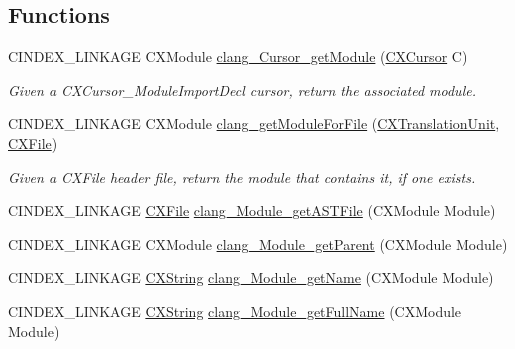 \subsection*{Functions}
\begin{DoxyCompactItemize}
\item 
\mbox{\label{group__CINDEX__MODULE_gab69ab0bc94760b2c93d63efa8cb6a6dd}} 
C\+I\+N\+D\+E\+X\+\_\+\+L\+I\+N\+K\+A\+GE C\+X\+Module \hyperlink{group__CINDEX__MODULE_gab69ab0bc94760b2c93d63efa8cb6a6dd}{clang\+\_\+\+Cursor\+\_\+get\+Module} (\hyperlink{structCXCursor}{C\+X\+Cursor} C)
\begin{DoxyCompactList}\small\item\em Given a C\+X\+Cursor\+\_\+\+Module\+Import\+Decl cursor, return the associated module. \end{DoxyCompactList}\item 
\mbox{\label{group__CINDEX__MODULE_ga22aa52a86a00c1af80f4858c0d5f00a6}} 
C\+I\+N\+D\+E\+X\+\_\+\+L\+I\+N\+K\+A\+GE C\+X\+Module \hyperlink{group__CINDEX__MODULE_ga22aa52a86a00c1af80f4858c0d5f00a6}{clang\+\_\+get\+Module\+For\+File} (\hyperlink{group__CINDEX_gacdb7815736ca709ce9a5e1ec2b7e16ac}{C\+X\+Translation\+Unit}, \hyperlink{group__CINDEX__FILES_gacfcea9c1239c916597e2e5b3e109215a}{C\+X\+File})
\begin{DoxyCompactList}\small\item\em Given a C\+X\+File header file, return the module that contains it, if one exists. \end{DoxyCompactList}\item 
C\+I\+N\+D\+E\+X\+\_\+\+L\+I\+N\+K\+A\+GE \hyperlink{group__CINDEX__FILES_gacfcea9c1239c916597e2e5b3e109215a}{C\+X\+File} \hyperlink{group__CINDEX__MODULE_gaa5095dd877556655d096d3165e86b0e1}{clang\+\_\+\+Module\+\_\+get\+A\+S\+T\+File} (C\+X\+Module Module)
\item 
C\+I\+N\+D\+E\+X\+\_\+\+L\+I\+N\+K\+A\+GE C\+X\+Module \hyperlink{group__CINDEX__MODULE_ga62e149a28d71b719b11aefee3d36df53}{clang\+\_\+\+Module\+\_\+get\+Parent} (C\+X\+Module Module)
\item 
C\+I\+N\+D\+E\+X\+\_\+\+L\+I\+N\+K\+A\+GE \hyperlink{structCXString}{C\+X\+String} \hyperlink{group__CINDEX__MODULE_ga39896de675e90c4fb2de55e109d376a8}{clang\+\_\+\+Module\+\_\+get\+Name} (C\+X\+Module Module)
\item 
C\+I\+N\+D\+E\+X\+\_\+\+L\+I\+N\+K\+A\+GE \hyperlink{structCXString}{C\+X\+String} \hyperlink{group__CINDEX__MODULE_ga09d2da739b4bbac05fa2c1ad6695095a}{clang\+\_\+\+Module\+\_\+get\+Full\+Name} (C\+X\+Module Module)

\end{DoxyCompactItemize}

